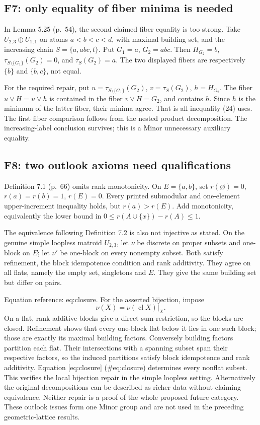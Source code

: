 \documentclass[10pt]{article}
\begin{document}
\subsection*{F7: only equality of fiber minima is needed}
In Lemma 5.25 (p. 54), the second claimed fiber equality is too strong. Take \(U_{2,3}\oplus U_{1,1}\) on atoms \(a<b<c<d\), with maximal building set, and the increasing chain \(S=\{a,abc,t\}\). Put \(G_1=a\), \(G_2=abc\). Then \(H_{G_2}=b\), \(\tau_{S\setminus\{G_1\}}(G_2)=0\), and \(\tau_S(G_2)=a\). The two displayed fibers are respectively \(\{b\}\) and \(\{b,c\}\), not equal.\par
For the required repair, put \(u=\tau_{S\setminus\{G_1\}}(G_2)\), \(v=\tau_S(G_2)\), \(h=H_{G_2}\). The fiber \(u\vee H=u\vee h\) is contained in the fiber \(v\vee H=G_2\), and contains \(h\). Since \(h\) is the minimum of the latter fiber, their minima agree. That is all inequality (24) uses. The first fiber comparison follows from the nested product decomposition. The increasing-label conclusion survives; this is a Minor unnecessary auxiliary equality.\par
\subsection*{F8: two outlook axioms need qualifications}
Definition 7.1 (p. 66) omits rank monotonicity. On \(E=\{a,b\}\), set \(r(\varnothing)=0\), \(r(a)=r(b)=1\), \(r(E)=0\). Every printed submodular and one-element upper-increment inequality holds, but \(r(a)>r(E)\). Add monotonicity, equivalently the lower bound in \(0\leq r(A\cup\{x\})-r(A)\leq1\).\par
The equivalence following Definition 7.2 is also not injective as stated. On the genuine simple loopless matroid \(U_{2,3}\), let \(\nu\) be discrete on proper subsets and one-block on \(E\); let \(\nu'\) be one-block on every nonempty subset. Both satisfy refinement, the block idempotence condition and rank additivity. They agree on all flats, namely the empty set, singletons and \(E\). They give the same building set but differ on pairs.\par
Equation reference: eq:closure. For the asserted bijection, impose \[
 \nu(X)=\nu(\operatorname{cl}X)|_X.\] On a flat, rank-additive blocks give a direct-sum restriction, so the blocks are closed. Refinement shows that every one-block flat below it lies in one such block; those are exactly its maximal building factors. Conversely building factors partition each flat. Their intersections with a spanning subset span their respective factors, so the induced partitions satisfy block idempotence and rank additivity. Equation [eq:closure] (\#eq:closure) determines every nonflat subset. This verifies the local bijection repair in the simple loopless setting. Alternatively the original decompositions can be described as richer data without claiming equivalence. Neither repair is a proof of the whole proposed future category. These outlook issues form one Minor group and are not used in the preceding geometric-lattice results.\par
\end{document}
